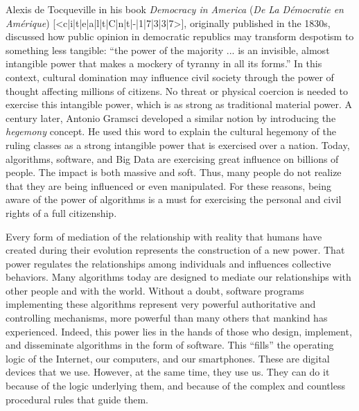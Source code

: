 Alexis de Tocqueville in his book \textit{Democracy in America} (\textit{De La D\'{e}mocratie en Am\'{e}rique}) [<c|i|t|e|a|l|t|C|n|t|-|1|7|3|3|7>], originally published in the 1830s, discussed how public opinion in democratic republics may transform despotism to something less tangible: ``the power of the majority ... is an invisible, almost intangible power that makes a mockery of tyranny in all its forms.'' In this context, cultural domination may influence civil society through the power of thought affecting millions of citizens. No threat or physical coercion is needed to exercise this intangible power, which is as strong as traditional material power. A century later, Antonio \hbox{Gramsci} developed a similar notion by introducing the \textit{hegemony} concept. He used this word to explain the cultural hegemony of the ruling classes as a strong intangible power that is exercised over a nation. Today, algorithms, software, and Big Data are exercising great influence on billions of people. The impact is both massive and soft. Thus, many people do not realize that they are being influenced or even \hbox{manipulated.} For these reasons, being aware of the power of algorithms is a must for exercising the personal and civil rights of a full citizenship.

Every form of mediation of the relationship with reality that humans have created during their evolution represents the construction of a new power. That power regulates the relationships among individuals and influences collective behaviors. Many algorithms today are designed to mediate our relationships with other people and with the world. Without a doubt, software programs implementing these algorithms represent very powerful authoritative and controlling mechanisms, more powerful than many others that mankind has experienced. Indeed, this power lies in the hands of those who design, implement, and disseminate algorithms in the form of software. This ``fills'' the operating logic of the Internet, our computers, and our smartphones. These are digital devices that we use. However, at the same time, they use us. They can do it because of the logic underlying them, and because of the complex and countless procedural rules that guide them.

